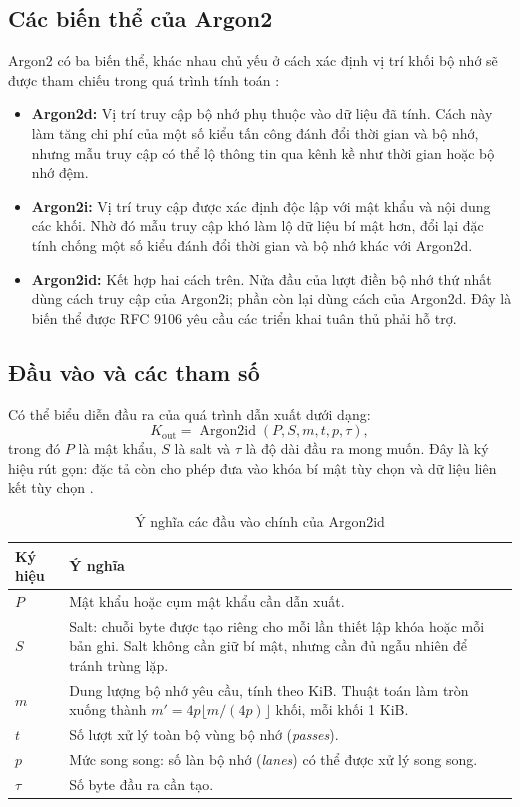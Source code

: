 \subsection{Các biến thể của Argon2}
Argon2 có ba biến thể, khác nhau chủ yếu ở cách xác định vị trí khối bộ nhớ sẽ được tham chiếu trong quá trình tính toán \cite{argon2rfc}:
\begin{itemize}
    \item \textbf{Argon2d:} Vị trí truy cập bộ nhớ phụ thuộc vào dữ liệu đã tính. Cách này làm tăng chi phí của một số kiểu tấn công đánh đổi thời gian và bộ nhớ, nhưng mẫu truy cập có thể lộ thông tin qua kênh kề như thời gian hoặc bộ nhớ đệm.
    \item \textbf{Argon2i:} Vị trí truy cập được xác định độc lập với mật khẩu và nội dung các khối. Nhờ đó mẫu truy cập khó làm lộ dữ liệu bí mật hơn, đổi lại đặc tính chống một số kiểu đánh đổi thời gian và bộ nhớ khác với Argon2d.
    \item \textbf{Argon2id:} Kết hợp hai cách trên. Nửa đầu của lượt điền bộ nhớ thứ nhất dùng cách truy cập của Argon2i; phần còn lại dùng cách của Argon2d. Đây là biến thể được RFC 9106 yêu cầu các triển khai tuân thủ phải hỗ trợ.
\end{itemize}

\subsection{Đầu vào và các tham số}
Có thể biểu diễn đầu ra của quá trình dẫn xuất dưới dạng:
\begin{equation}
    K_{\mathrm{out}} = \operatorname{Argon2id}(P,S,m,t,p,\tau),
\end{equation}
trong đó $P$ là mật khẩu, $S$ là salt và $\tau$ là độ dài đầu ra mong muốn. Đây là ký hiệu rút gọn: đặc tả còn cho phép đưa vào khóa bí mật tùy chọn và dữ liệu liên kết tùy chọn \cite{argon2rfc}.

\begin{table}[htbp]
\centering
\caption{Ý nghĩa các đầu vào chính của Argon2id}
\begin{tabular}{>{\raggedright\arraybackslash}p{2.0cm} >{\raggedright\arraybackslash}p{10.2cm}}
\toprule
\textbf{Ký hiệu} & \textbf{Ý nghĩa} \\
\midrule
$P$ & Mật khẩu hoặc cụm mật khẩu cần dẫn xuất. \\
$S$ & Salt: chuỗi byte được tạo riêng cho mỗi lần thiết lập khóa hoặc mỗi bản ghi. Salt không cần giữ bí mật, nhưng cần đủ ngẫu nhiên để tránh trùng lặp. \\
$m$ & Dung lượng bộ nhớ yêu cầu, tính theo KiB. Thuật toán làm tròn xuống thành $m'=4p\lfloor m/(4p)\rfloor$ khối, mỗi khối 1 KiB. \\
$t$ & Số lượt xử lý toàn bộ vùng bộ nhớ (\textit{passes}). \\
$p$ & Mức song song: số làn bộ nhớ (\textit{lanes}) có thể được xử lý song song. \\
$\tau$ & Số byte đầu ra cần tạo. \\
\bottomrule
\end{tabular}
\end{table}

